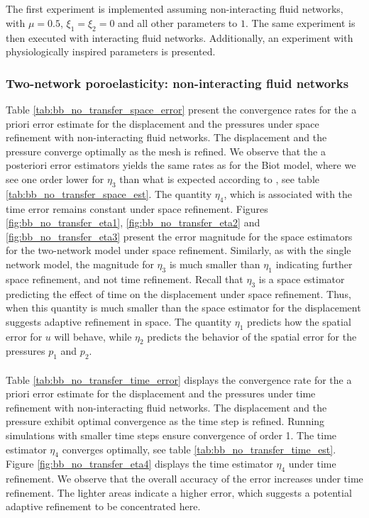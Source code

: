 \\
\\
The first experiment is implemented assuming non-interacting fluid networks, with $\mu = 0.5$, $\xi_1 = \xi_2 = 0$ and all other parameters to $1$. The same experiment is then executed with interacting fluid networks. Additionally, an experiment with physiologically inspired parameters is presented.  
\\
\subsubsection{Two-network poroelasticity: non-interacting fluid networks}
Table \ref{tab:bb_no_transfer_space_error} present the convergence rates for the a priori error estimate for the displacement and the pressures under space refinement with non-interacting fluid networks. The displacement and the pressure converge optimally as the mesh is refined. We observe that the a posteriori error estimators yields the same rates as for the Biot model, where we see one order lower for $\eta_3$ than what is expected according to \cite{meunier}, see table \ref{tab:bb_no_transfer_space_est}. The quantity $\eta_4$, which is associated with the time error remains constant under space refinement. Figures \ref{fig:bb_no_transfer_eta1}, \ref{fig:bb_no_transfer_eta2} and \ref{fig:bb_no_transfer_eta3} present the error magnitude for the space estimators for the two-network model under space refinement. Similarly, as with the single network model, the magnitude for $\eta_3$ is much smaller than $\eta_1$ indicating further space refinement, and not time refinement. Recall that $\eta_3$ is a space estimator predicting the effect of time on the displacement under space refinement. Thus, when this quantity is much smaller than the space estimator for the displacement suggests adaptive refinement in space. The quantity $\eta_1$ predicts how the spatial error for $u$ will behave, while $\eta_2$ predicts the behavior of the spatial error for the pressures $p_1$ and $p_2$.
\\
\\
Table \ref{tab:bb_no_transfer_time_error} displays the convergence rate for the a priori error estimate for the displacement and the pressures under time refinement with non-interacting fluid networks. The displacement and the pressure exhibit optimal convergence as the time step is refined. Running simulations with smaller time steps ensure convergence of order 1. The time estimator $\eta_4$ converges optimally, see table \ref{tab:bb_no_transfer_time_est}. Figure \ref{fig:bb_no_transfer_eta4} displays the time estimator $\eta_4$ under time refinement. We observe that the overall accuracy of the error increases under time refinement. The lighter areas indicate a higher error, which suggests a potential adaptive refinement to be concentrated here. 
